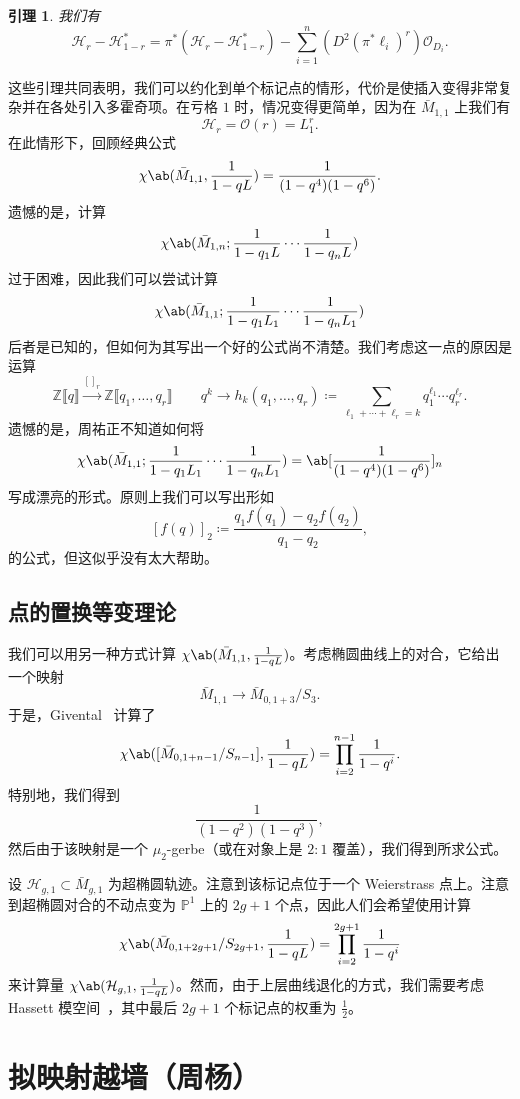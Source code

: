 \documentclass{amsart}
\newtheorem{lem}[thm]{引理}
\theoremstyle{definition}
\theoremstyle{remark}
\theoremstyle{plain}
\theoremstyle{definition}
\theoremstyle{remark}
\newcommand{\Z}{\mathbb{Z}}
\renewcommand{\P}{\mathbb{P}}
\newcommand{\mc}[1]{\mathcal{#1}}
\newcommand{\1}{\mathbf{1}}
\newcommand{\2}{\mathbf{2}}
\newcommand{\3}{\mathbf{3}}
\newcommand{\ps}[1]{\llbracket #1 \rrbracket}
\begin{document}
\begin{lem}
    我们有
    \[ \mc{H}_r - \mc{H}_{1-r}^* = \pi^* (\mc{H}_r - \mc{H}_{1-r}^*) - \sum_{i=1}^n (D^2 (\pi^* \ell_i)^r) \mc{O}_{D_i}. \]
\end{lem}

这些引理共同表明，我们可以约化到单个标记点的情形，代价是使插入变得非常复杂并在各处引入多霍奇项。在亏格 \(1\) 时，情况变得更简单，因为在 \(\bar{M}_{1,1}\) 上我们有
\[ \mc{H}_r = \mc{O}(r) = L_1^r. \]
在此情形下，回顾经典公式
\[ \chi\ab(\bar{M}_{1,1}, \frac{1}{1-qL}) = \frac{1}{(1-q^4)(1-q^6)}. \]
遗憾的是，计算
\[ \chi\ab(\bar{M}_{1,n}; \frac{1}{1-q_1 L} \cdots \frac{1}{1-q_n L}) \]
过于困难，因此我们可以尝试计算
\[ \chi\ab(\bar{M}_{1,1}; \frac{1}{1-q_1 L_1} \cdots \frac{1}{1-q_n L_1})  \]
后者是已知的，但如何为其写出一个好的公式尚不清楚。我们考虑这一点的原因是运算
\[ \Z\ps{q} \xrightarrow{[]_r} \Z\ps{q_1, \ldots, q_r} \qquad q^k \to h_k(q_1, \ldots, q_r) \coloneqq \sum_{\ell_1 + \cdots + \ell_r = k} q_1^{\ell_1} \cdots q_r^{\ell_r}. \]
遗憾的是，周祐正不知道如何将
\[ \chi\ab(\bar{M}_{1,1}; \frac{1}{1-q_1 L_1} \cdots \frac{1}{1-q_n L_1}) = \ab[\frac{1}{(1-q^4)(1-q^6)}]_n \]
写成漂亮的形式。原则上我们可以写出形如
\[ [f(q)]_2 \coloneqq \frac{q_1 f(q_1) - q_2 f(q_2)}{q_1 - q_2}, \]
的公式，但这似乎没有太大帮助。

\subsection{点的置换等变理论}%
\label{sub:Permutation-equivariant theory of a point}

我们可以用另一种方式计算 \(\chi\ab(\bar{M}_{1,1}, \frac{1}{1-q L})\)。考虑椭圆曲线上的对合，它给出一个映射
\[ \bar{M}_{1,1} \to \bar{M}_{0,1+3}/S_3. \]
于是，Givental~\cite{Givental2017K1} 计算了
\[ \chi\ab([\bar{M}_{0,1+n-1}/S_{n-1}], \frac{1}{1-qL}) = \prod_{i=2}^{n-1} \frac{1}{1-q^i}. \]
特别地，我们得到
\[ \frac{1}{(1-q^2)(1-q^3)}, \]
然后由于该映射是一个 \(\mu_2\)-gerbe（或在对象上是 \(2:1\) 覆盖），我们得到所求公式。

设 \(\mc{H}_{g,1} \subset \bar{M}_{g,1}\) 为超椭圆轨迹。注意到该标记点位于一个 Weierstrass 点上。注意到超椭圆对合的不动点变为 \(\P^1\) 上的 \(2g+1\) 个点，因此人们会希望使用计算
\[ \chi\ab(\bar{M}_{0,1+2g+1}/S_{2g+1}, \frac{1}{1-q L}) = \prod_{i=2}^{2g+1} \frac{1}{1-q^i} \]
来计算量
\(\chi\ab(\mc{H}_{g,1}, \frac{1}{1-qL})\)。然而，由于上层曲线退化的方式，我们需要考虑 Hassett 模空间~\cite{Hassett2003}，其中最后 \(2g+1\) 个标记点的权重为 \(\frac{1}{2}\)。
 
\section{拟映射越墙（周杨）}%
\label{sec:Quasimap wall-crossing (Yang Zhou)}
\end{document}
